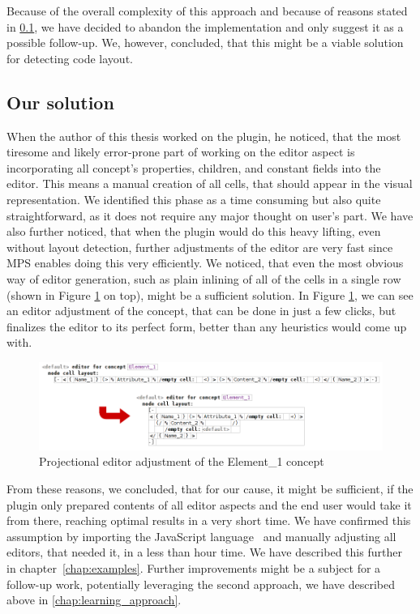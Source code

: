 Because of the overall complexity of this approach and because of reasons stated in \ref{chap:editor_solution}, we have decided to abandon the implementation and only suggest it as a possible follow-up.
We, however, concluded, that this might be a viable solution for detecting code layout.

\subsection{Our solution}
\label{chap:editor_solution}

When the author of this thesis worked on the plugin, he noticed, that the most tiresome and likely error-prone part of working on the editor aspect is incorporating all concept's properties, children, and constant fields into the editor.
This means a manual creation of all cells, that should appear in the visual representation.
We identified this phase as a time consuming but also quite straightforward, as it does not require any major thought on user's part.
We have also further noticed, that when the plugin would do this heavy lifting, even without layout detection, further adjustments of the editor are very fast since MPS enables doing this very efficiently.
We noticed, that even the most obvious way of editor generation, such as plain inlining of all of the cells in a single row (shown in Figure \ref{fig:editor_adjustment} on top), might be a sufficient solution.
In Figure \ref{fig:editor_adjustment}, we can see an editor adjustment of the  concept, that can be done in just a few clicks, but finalizes the editor to its perfect form, better than any heuristics would come up with.
\\

\begin{figure}[h]
	\centering
	\includegraphics[width=\textwidth]{./img/editor_adjustment.png}
	\caption{Projectional editor adjustment of the Element{\_}1 concept}
	\label{fig:editor_adjustment}
\end{figure}

From these reasons, we concluded, that for our cause, it might be sufficient, if the plugin only prepared contents of all editor aspects and the end user would take it from there, reaching optimal results in a very short time.
We have confirmed this assumption by importing the JavaScript language~\cite{javascript} and manually adjusting all editors, that needed it, in a less than hour time.
We have described this further in chapter~\ref{chap:examples}.
Further improvements might be a subject for a follow-up work, potentially leveraging the second approach, we have described above in \ref{chap:learning_approach}.

